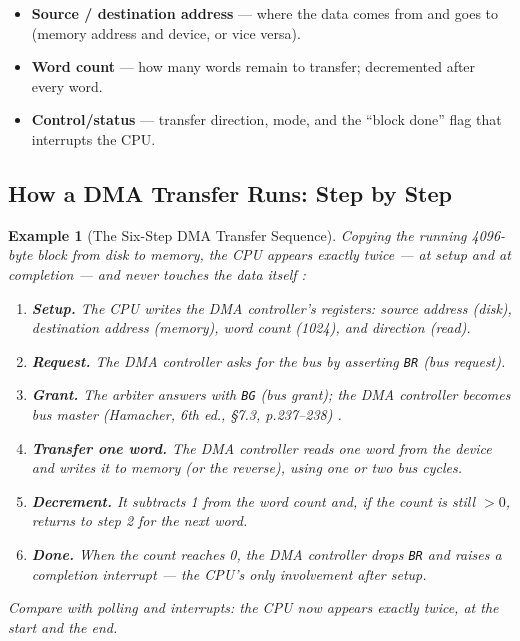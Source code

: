 \documentclass[11pt]{article}
\newtheorem{example}{Example}[section]
\begin{document}
\begin{itemize}
  \item \textbf{Source / destination address} --- where the data comes from and goes to (memory address and device, or vice versa).
  \item \textbf{Word count} --- how many words remain to transfer; decremented after every word.
  \item \textbf{Control/status} --- transfer direction, mode, and the ``block done'' flag that interrupts the CPU.
\end{itemize}

\subsection{How a DMA Transfer Runs: Step by Step}

\begin{example}[The Six-Step DMA Transfer Sequence]
\label{ex:dma-seq}
Copying the running 4096-byte block from disk to memory, the CPU appears exactly twice --- at setup and at completion --- and never touches the data itself \cite{Stallings2015_computer_organization}:
\begin{enumerate}
  \item \textbf{Setup.} The CPU writes the DMA controller's registers: source address (disk), destination address (memory), word count (1024), and direction (read).
  \item \textbf{Request.} The DMA controller asks for the bus by asserting \texttt{BR} (bus request).
  \item \textbf{Grant.} The arbiter answers with \texttt{BG} (bus grant); the DMA controller becomes bus master (Hamacher, 6th ed., \S7.3, p.237--238) \cite{Hamacher2002_computer_organization}.
  \item \textbf{Transfer one word.} The DMA controller reads one word from the device and writes it to memory (or the reverse), using one or two bus cycles.
  \item \textbf{Decrement.} It subtracts 1 from the word count and, if the count is still $>0$, returns to step 2 for the next word.
  \item \textbf{Done.} When the count reaches 0, the DMA controller drops \texttt{BR} and raises a \emph{completion interrupt} --- the CPU's only involvement after setup.
\end{enumerate}
Compare with polling and interrupts: the CPU now appears exactly twice, at the start and the end.
\end{example}
\end{document}

